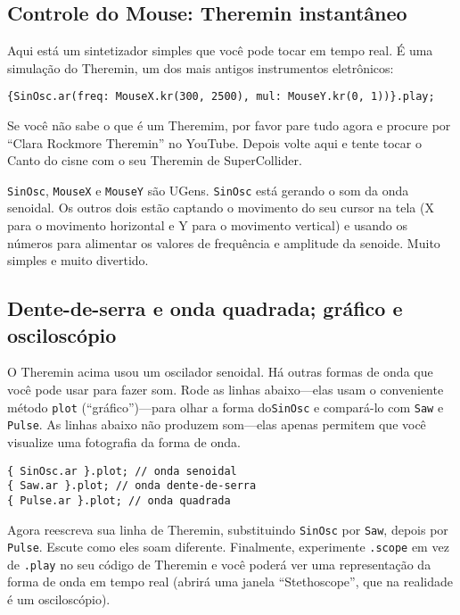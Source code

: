 \subsection{Controle do Mouse: Theremin instantâneo}

Aqui está um sintetizador simples que você pode tocar em tempo real. É uma simulação do Theremin, um dos mais antigos instrumentos eletrônicos:

\begin{lstlisting}[style=SuperCollider-IDE, basicstyle=\scttfamily\footnotesize]
{SinOsc.ar(freq: MouseX.kr(300, 2500), mul: MouseY.kr(0, 1))}.play;
\end{lstlisting}

Se você não sabe o que é um Theremim, por favor pare tudo agora e procure por “Clara Rockmore Theremin” no YouTube. Depois volte aqui e tente tocar o Canto do cisne com o seu Theremin de SuperCollider.

\texttt{SinOsc}, \texttt{MouseX} e \texttt{MouseY} são UGens. \texttt{SinOsc} está gerando o som da onda senoidal. Os outros dois estão captando o movimento do seu cursor na tela (X para o movimento horizontal e Y para o movimento vertical) e usando os números para alimentar os valores de frequência e amplitude da senoide. Muito simples e muito divertido.

\subsection{Dente-de-serra e onda quadrada; gráfico e osciloscópio}

O Theremin acima usou um oscilador senoidal. Há outras formas de onda que você pode usar para fazer som. Rode as linhas abaixo---elas usam o conveniente método \texttt{plot} (“gráfico”)---para olhar a forma do\texttt{SinOsc} e compará-lo com \texttt{Saw} e \texttt{Pulse}. As linhas abaixo não produzem som---elas apenas permitem que você visualize uma fotografia da forma de onda.

\begin{lstlisting}[style=SuperCollider-IDE, basicstyle=\scttfamily\footnotesize]
{ SinOsc.ar }.plot; // onda senoidal
{ Saw.ar }.plot; // onda dente-de-serra
{ Pulse.ar }.plot; // onda quadrada
\end{lstlisting}

Agora reescreva sua linha de Theremin, substituindo \texttt{SinOsc} por \texttt{Saw}, depois por \texttt{Pulse}. Escute como eles soam diferente. Finalmente, experimente \texttt{.scope} em vez de \texttt{.play} no seu código de Theremin e você poderá ver uma representação da forma de onda em tempo real (abrirá uma janela “Stethoscope”, que na realidade é um osciloscópio).
